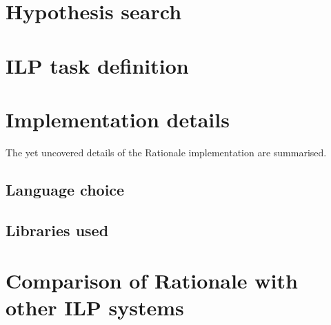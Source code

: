 \section{Hypothesis search}

\section{ILP task definition}

\section{Implementation details}
The yet uncovered details of the Rationale implementation are summarised.

\subsection{Language choice}

\subsection{Libraries used}

\section{Comparison of Rationale with other ILP systems}